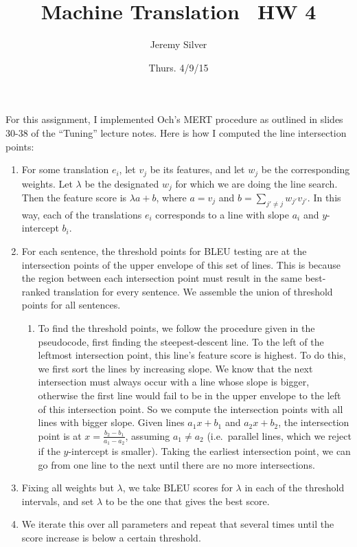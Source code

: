 \documentclass[11pt, oneside]{article}      %
\title{Machine Translation \textemdash \, HW 4}
\author{Jeremy Silver}
\date{Thurs. 4/9/15}                          %
\begin{document}
\maketitle

For this assignment, I implemented Och's MERT procedure as outlined in slides 30-38 of the ``Tuning'' lecture notes.  Here is how I computed the line intersection points:

\begin{enumerate}
\item For some translation $e_i$, let $v_j$ be its features, and let $w_j$ be the corresponding weights.  Let $\lambda$ be the designated $w_j$ for which we are doing the line search.  Then the feature score is $\lambda a + b$, where $a = v_j$ and $b = \sum_{j' \neq j} w_{j'} v_{j'}$.  In this way, each of the translations $e_i$ corresponds to a line with slope $a_i$ and $y$-intercept $b_i$.  
\item For each sentence, the threshold points for BLEU testing are at the intersection points of the upper envelope of this set of lines.  This is because the region between each intersection point must result in the same best-ranked translation for every sentence.  We assemble the union of threshold points for all sentences.
\begin{enumerate}
\item To find the threshold points, we follow the procedure given in the pseudocode, first finding the steepest-descent line.  To the left of the leftmost intersection point, this line's feature score is highest.  To do this, we first sort the lines by increasing slope.  We know that the next intersection must always occur with a line whose slope is bigger, otherwise the first line would fail to be in the upper envelope to the left of this intersection point.  So we compute the intersection points with all lines with bigger slope.  Given lines $a_1 x + b_1$ and $a_2 x + b_2$, the intersection point is at $x = \frac{b_2 - b_1}{a_1 - a_2}$, assuming $a_1 \neq a_2$ (i.e.\ parallel lines, which we reject if the $y$-intercept is smaller).  Taking the earliest intersection point, we can go from one line to the next until there are no more intersections.
\end{enumerate}
\item Fixing all weights but $\lambda$, we take BLEU scores for $\lambda$ in each of the threshold intervals, and set $\lambda$ to be the one that gives the best score.
\item We iterate this over all parameters and repeat that several times until the score increase is below a certain threshold.
\end{enumerate}
\end{document}
